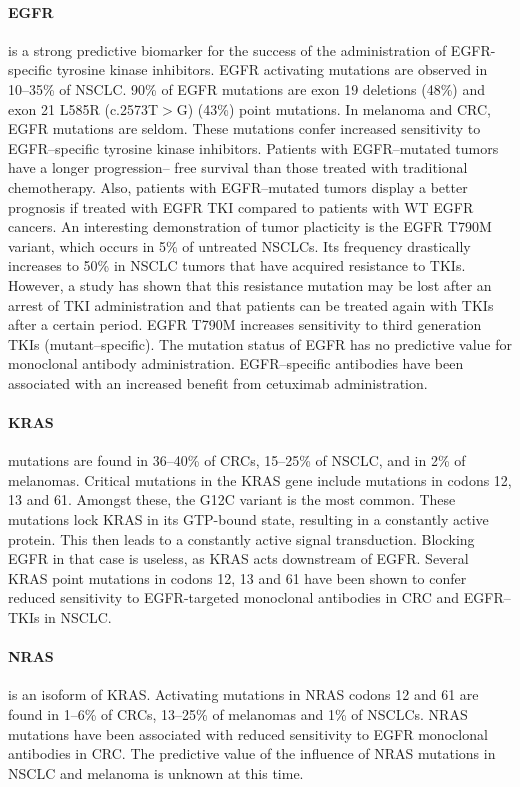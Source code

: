 {{{      \paragraph{EGFR} is a strong predictive biomarker for the success of the
      administration of EGFR-specific tyrosine kinase inhibitors. EGFR
      activating mutations are observed in 10--35\% of NSCLC. 90\% of EGFR
      mutations are exon 19 deletions (48\%) and exon 21 L585R (c.2573T$>$G)
      (43\%) point mutations. In melanoma and CRC, EGFR mutations are seldom.
      These mutations confer increased sensitivity to EGFR--specific tyrosine
      kinase inhibitors. Patients with EGFR--mutated tumors have a longer
      progression-- free survival than those treated with traditional
      chemotherapy. Also, patients with EGFR--mutated tumors display a better
      prognosis if treated with EGFR TKI compared to patients with WT EGFR
      cancers. An interesting demonstration of tumor placticity is the EGFR
      T790M variant, which occurs in 5\% of untreated NSCLCs. Its frequency
      drastically increases to 50\% in NSCLC tumors that have acquired
      resistance to TKIs. However, a study has shown that this resistance
      mutation may be lost after an arrest of TKI administration and that
      patients can be treated again with TKIs after a certain period. EGFR
      T790M increases sensitivity to third generation TKIs (mutant--specific).
      The mutation status of EGFR has no predictive value for monoclonal
      antibody administration. EGFR--specific antibodies have been associated
      with an increased benefit from cetuximab administration. 

      \paragraph{KRAS} mutations are found in 36--40\% of CRCs, 15--25\% of
      NSCLC, and in 2\% of melanomas. Critical mutations in the KRAS gene
      include mutations in codons 12, 13 and 61. Amongst these, the G12C variant
      is the most common. These mutations lock KRAS in its GTP-bound state,
      resulting in a constantly active protein. This then leads to a constantly
      active signal transduction. Blocking EGFR in that case is useless, as KRAS
      acts downstream of EGFR. Several KRAS point mutations in codons 12, 13 and
      61 have been shown to confer reduced sensitivity to EGFR-targeted
      monoclonal antibodies in CRC and EGFR--TKIs in NSCLC.

      \paragraph{NRAS} is an isoform of KRAS. Activating mutations in NRAS
      codons 12 and 61 are found in 1--6\% of CRCs, 13--25\% of melanomas and
      1\% of NSCLCs. NRAS mutations have been associated with reduced
      sensitivity to EGFR monoclonal antibodies in CRC. The predictive value of
      the influence of NRAS mutations in NSCLC and
      melanoma is unknown at this time.

}}}
